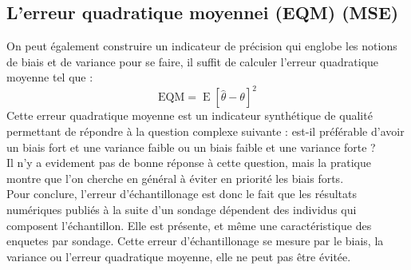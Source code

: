 \documentclass[a4paper]{article}
\DeclareMathOperator{\E}{E}
\begin{document}
\subsection{L'erreur quadratique moyennei (EQM) (MSE)}
On peut également construire un indicateur de précision qui englobe les notions de biais et de variance pour se faire, il suffit de calculer l'erreur
quadratique moyenne tel que :
\begin{equation*}
    \text{EQM} = \E\left[\hat{\theta} - \theta\right]^2
\end{equation*}
Cette erreur quadratique moyenne est un indicateur synthétique
de qualité permettant de répondre à la question complexe suivante : est-il préférable d'avoir un biais fort et une variance faible ou un biais faible
et une variance forte ? \\
Il n'y a evidement pas de bonne réponse à cette question, mais la pratique montre que l'on cherche en général à éviter en priorité les biais forts. \\

Pour conclure, l'erreur d'échantillonage est donc le fait que les résultats numériques publiés à la suite d'un sondage dépendent des individus qui
composent l'échantillon. Elle est présente, et même une caractéristique des enquetes par sondage. Cette erreur d'échantillonage se mesure par le
biais, la variance ou l'erreur quadratique moyenne, elle ne peut pas être évitée.\\
\end{document}
